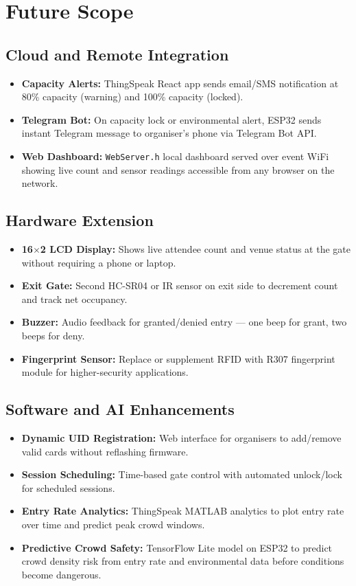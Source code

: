 \documentclass[12pt,a4paper]{report}
\begin{document}
{\section{Future Scope}

\subsection{Cloud and Remote Integration}
\begin{itemize}[leftmargin=*]
    \item \textbf{Capacity Alerts:} ThingSpeak React app sends email/SMS notification at 80\% capacity (warning) and 100\% capacity (locked).
    \item \textbf{Telegram Bot:} On capacity lock or environmental alert, ESP32 sends instant Telegram message to organiser's phone via Telegram Bot API.
    \item \textbf{Web Dashboard:} \texttt{WebServer.h} local dashboard served over event WiFi showing live count and sensor readings accessible from any browser on the network.
\end{itemize}

\subsection{Hardware Extension}
\begin{itemize}[leftmargin=*]
    \item \textbf{16$\times$2 LCD Display:} Shows live attendee count and venue status at the gate without requiring a phone or laptop.
    \item \textbf{Exit Gate:} Second HC-SR04 or IR sensor on exit side to decrement count and track net occupancy.
    \item \textbf{Buzzer:} Audio feedback for granted/denied entry --- one beep for grant, two beeps for deny.
    \item \textbf{Fingerprint Sensor:} Replace or supplement RFID with R307 fingerprint module for higher-security applications.
\end{itemize}

\subsection{Software and AI Enhancements}
\begin{itemize}[leftmargin=*]
    \item \textbf{Dynamic UID Registration:} Web interface for organisers to add/remove valid cards without reflashing firmware.
    \item \textbf{Session Scheduling:} Time-based gate control with automated unlock/lock for scheduled sessions.
    \item \textbf{Entry Rate Analytics:} ThingSpeak MATLAB analytics to plot entry rate over time and predict peak crowd windows.
    \item \textbf{Predictive Crowd Safety:} TensorFlow Lite model on ESP32 to predict crowd density risk from entry rate and environmental data before conditions become dangerous.
\end{itemize}

}
\end{document}
